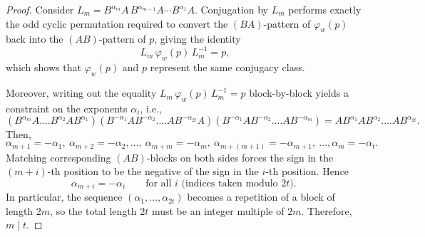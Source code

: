 \documentclass[10pt,a4paper]{amsart}
\begin{document}
\begin{proof}
Consider $L_m = B^{\alpha_m}A\, B^{\alpha_{m-1}}A \cdots B^{\alpha_1}A$. Conjugation by $L_m$ performs exactly the odd cyclic permutation 
required to convert the $(BA)$-pattern of $\varphi_{w}(p)$ back into the $(AB)$-pattern of 
$p$, giving the identity
\[
L_m\,\varphi_{w}(p)\,L_m^{-1} = p,
\]
which shows that $\varphi_{w}(p)$ and $p$ represent the same conjugacy class.

Moreover, writing out the equality $L_m\,\varphi_{w}(p)\,L_m^{-1} = p$ block-by-block yields a 
constraint on the exponents $\alpha_i$, i.e.,
$$ 
(B^{\alpha_m}A....B^{\alpha_2}AB^{\alpha_1})(B^{-\alpha_1}AB^{-\alpha_2}....AB^{-\alpha_{2t}}A)(B^{-\alpha_1}AB^{-\alpha_2}....AB^{-\alpha_m}) = AB^{\alpha_1}AB^{\alpha_2}....AB^{\alpha_{2t}}.
 $$   
 Then, $$\alpha_{m+1} = -\alpha_1,
 ~\alpha_{m+2} = -\alpha_2,
 \ldots, ~\alpha_{m+m} = -\alpha_m,~
 \alpha_{m+(m+1)} = -\alpha_{m+1},~
 \ldots, \alpha_{m} = -\alpha_t.$$
Matching corresponding $(AB)$-blocks on both sides 
forces the sign in the $(m+i)$-th position to be the negative of the sign in the $i$-th 
position. Hence
\[
\alpha_{m+i} = -\alpha_i \qquad \text{for all } i \text{ (indices taken modulo $2t$). }
\]
In particular, the sequence $(\alpha_1,\ldots,\alpha_{2t})$ becomes a repetition of a block of 
length $2m$, so the total length $2t$ must be an integer multiple of $2m$. Therefore, $m \mid t$.
\end{proof}
\end{document}
